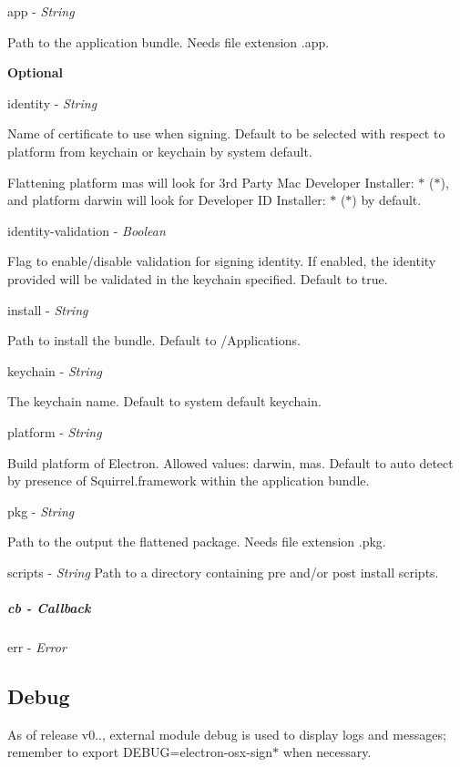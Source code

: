 {\ttfamily app} -\/ {\itshape String}

Path to the application bundle. Needs file extension {\ttfamily .app}.

{\bfseries Optional}

{\ttfamily identity} -\/ {\itshape String}

Name of certificate to use when signing. Default to be selected with respect to {\ttfamily platform} from {\ttfamily keychain} or keychain by system default.

Flattening platform {\ttfamily mas} will look for {\ttfamily 3rd Party Mac Developer Installer\+: $\ast$ ($\ast$)}, and platform {\ttfamily darwin} will look for {\ttfamily Developer ID Installer\+: $\ast$ ($\ast$)} by default.

{\ttfamily identity-\/validation} -\/ {\itshape Boolean}

Flag to enable/disable validation for signing identity. If enabled, the {\ttfamily identity} provided will be validated in the {\ttfamily keychain} specified. Default to {\ttfamily true}.

{\ttfamily install} -\/ {\itshape String}

Path to install the bundle. Default to {\ttfamily /\+Applications}.

{\ttfamily keychain} -\/ {\itshape String}

The keychain name. Default to system default keychain.

{\ttfamily platform} -\/ {\itshape String}

Build platform of Electron. Allowed values\+: {\ttfamily darwin}, {\ttfamily mas}. Default to auto detect by presence of {\ttfamily Squirrel.\+framework} within the application bundle.

{\ttfamily pkg} -\/ {\itshape String}

Path to the output the flattened package. Needs file extension {\ttfamily .pkg}.

{\ttfamily scripts} -\/ {\itshape String} Path to a directory containing pre and/or post install scripts.

\subparagraph*{cb -\/ Callback}

{\ttfamily err} -\/ {\itshape Error}

\subsection*{Debug}

As of release v0.., external module {\ttfamily debug} is used to display logs and messages; remember to {\ttfamily export D\+E\+B\+UG=electron-\/osx-\/sign$\ast$} when necessary.

